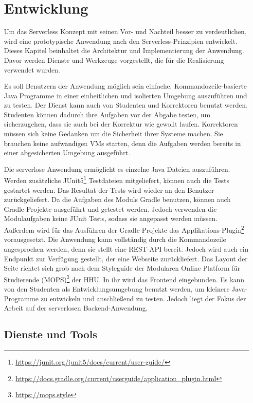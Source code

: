 \chapter{Entwicklung}
Um das Serverless Konzept mit seinen Vor- und Nachteil
besser zu verdeutlichen, wird eine prototypische Anwendung nach den Serverless-Prinzipien
entwickelt. Dieses Kapitel beinhaltet die Architektur und Implementierung
der Anwendung. Davor werden Dienste und Werkzeuge vorgestellt,
die für die Realisierung verwendet wurden.

Es soll Benutzern der Anwendung möglich sein einfache, Kommandozeile-basierte
Java Programme in einer einheitlichen und isolierten Umgebung
auszuführen und zu testen. Der Dienst kann auch von Studenten und
Korrektoren benutzt werden.
Studenten können dadurch ihre Aufgaben vor der Abgabe testen, um sicherzugehen,
dass sie auch bei der Korrektur wie gewollt laufen.
Korrektoren müssen sich keine Gedanken um die Sicherheit ihrer Systeme
machen. Sie brauchen keine aufwändigen VMs starten, denn die Aufgaben werden
bereits in einer abgesicherten Umgebung ausgeführt.

Die serverlose Anwendung ermöglicht es einzelne Java Dateien auszuführen.
Werden zusätzliche JUnit5\footnote{\url{https://junit.org/junit5/docs/current/user-guide/}}
Testdateien mitgeliefert, können auch die Tests gestartet werden.
Das Resultat der Tests wird wieder an den Benutzer zurückgeliefert.
Da die Aufgaben des Moduls Gradle benutzen,
können auch Gradle-Projekte ausgeführt und getestet werden.
Jedoch verwenden die Modulaufgaben keine JUnit Tests, sodass sie angepasst werden müssen.
Außerdem wird für das Ausführen der Gradle-Projekte
das Applikations-Plugin\footnote{\url{https://docs.gradle.org/current/userguide/application_plugin.html}}
vorausgesetzt. Die Anwendung kann vollständig durch die Kommandozeile angesprochen werden, denn
sie stellt eine REST-API bereit.
Jedoch wird auch ein Endpunkt zur Verfügung gestellt, der eine Webseite zurückliefert.
Das Layout der Seite richtet sich grob nach dem Styleguide der
Modularen Online Platform für Studierende (MOPS)\footnote{\url{https://mops.style}}
der HHU. In ihr wird das Frontend eingebunden.
Es kann von den Studenten als Entwicklungsumgebung benutzt werden, um
kleinere Java-Programme zu entwickeln und anschließend zu testen.
Jedoch liegt der Fokus der Arbeit auf der serverlosen Backend-Anwendung.


\section{Dienste und Tools}
